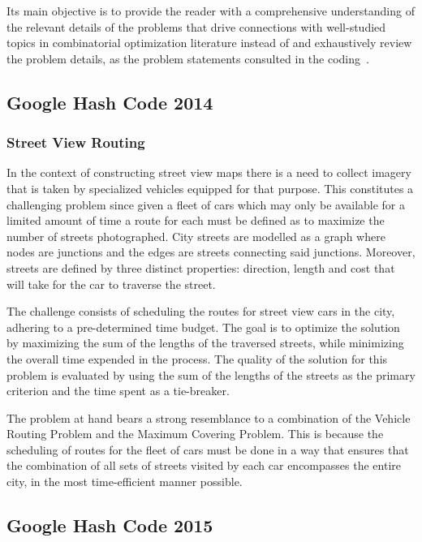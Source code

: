 Its main objective is to provide the reader with a comprehensive understanding
of the relevant details of the problems that drive connections with well-studied
topics in combinatorial optimization literature instead of and exhaustively
review the problem details, as the problem statements consulted in the
coding~\cite{googlellc2023codingcompetitionsarchive}.

\subsection{Google Hash Code 2014}
\label{subsec:hashcode-2014}

\subsubsection*{Street View Routing}
\label{subsubsec:hashcode-2014-final}

In the context of constructing street view maps there is a need to collect
imagery that is taken by specialized vehicles equipped for that purpose. This
constitutes a challenging problem since given a fleet of cars which may only be
available for a limited amount of time a route for each must be defined as to
maximize the number of streets photographed. City streets are modelled as a
graph where nodes are junctions and the edges are streets connecting said
junctions. Moreover, streets are defined by three distinct properties:
direction, length and cost that will take for the car to traverse the street.

The challenge consists of scheduling the routes for street view cars in the
city, adhering to a pre-determined time budget. The goal is to optimize the
solution by maximizing the sum of the lengths of the traversed streets, while
minimizing the overall time expended in the process. The quality of the solution
for this problem is evaluated by using the sum of the lengths of the streets as
the primary criterion and the time spent as a tie-breaker.

The problem at hand bears a strong resemblance to a combination of the Vehicle
Routing Problem and the Maximum Covering Problem. This is because the scheduling
of routes for the fleet of cars must be done in a way that ensures that the
combination of all sets of streets visited by each car encompasses the entire
city, in the most time-efficient manner possible.

\subsection{Google Hash Code 2015}
\label{subsec:hashcode-2015}

